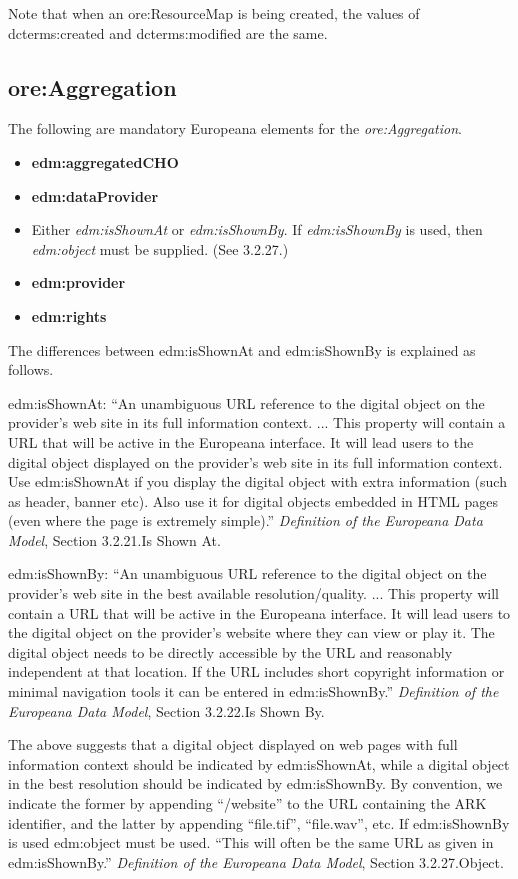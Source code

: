 \documentclass[11pt]{article}
\begin{document}
Note that when an ore:ResourceMap is being created, the values of dcterms:created and dcterms:modified are the same.

\subsection{ore:Aggregation}

The following are mandatory Europeana elements for the \textit{ore:Aggregation}.

\begin{itemize}
\item \textbf{edm:aggregatedCHO}
\item \textbf{edm:dataProvider}
\item Either \textit{edm:isShownAt} or \textit{edm:isShownBy}. If \textit{edm:isShownBy} is used, then \textit{edm:object} must be supplied. (See 3.2.27.)
\item \textbf{edm:provider}
\item \textbf{edm:rights}
\end{itemize}

The differences between edm:isShownAt and edm:isShownBy is explained as follows.

edm:isShownAt: ``An unambiguous URL reference to the digital object on the provider’s web
site in its full information context. ... This property will contain a URL that will be active in the Europeana
interface. It will lead users to the digital object displayed on the provider’s
web site in its full information context. Use edm:isShownAt if you display the
digital object with extra information (such as header, banner etc). Also use it
for digital objects embedded in HTML pages (even where the page is
extremely simple).'' \textit{Definition of the Europeana Data Model}, Section 3.2.21.Is Shown At.

edm:isShownBy: ``An unambiguous URL reference to the digital object on the provider’s web
site in the best available resolution/quality. ... This property will contain a URL that will be active in the Europeana
interface. It will lead users to the digital object on the provider’s website
where they can view or play it. The digital object needs to be directly
accessible by the URL and reasonably independent at that location. If the
URL includes short copyright information or minimal navigation tools it can
be entered in edm:isShownBy.'' \textit{Definition of the Europeana Data Model}, Section 3.2.22.Is Shown By.

The above suggests that a digital object displayed on web pages with full information context should be indicated by edm:isShownAt, while a digital object in the best resolution should be indicated by edm:isShownBy. By convention, we indicate the former by appending ``/website'' to the URL containing the ARK identifier, and the latter by appending ``file.tif'', ``file.wav'', etc. If edm:isShownBy is used edm:object must be used. ``This will often be the same URL as given in edm:isShownBy.'' \textit{Definition of the Europeana Data Model}, Section 3.2.27.Object.
\end{document}
